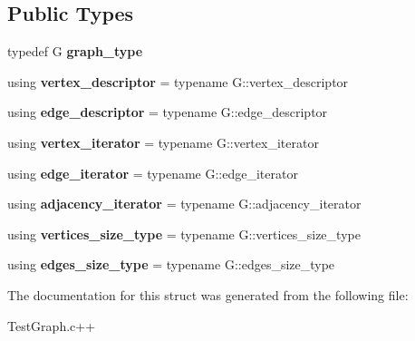 \subsection*{Public Types}
\begin{DoxyCompactItemize}
\item 
\hypertarget{structTestGraph_a149d9d185e2299b108590e2f83804351}{typedef G {\bfseries graph\-\_\-type}}\label{structTestGraph_a149d9d185e2299b108590e2f83804351}

\item 
\hypertarget{structTestGraph_ab66a56354d7a5751bf100ed3318bc498}{using {\bfseries vertex\-\_\-descriptor} = typename G\-::vertex\-\_\-descriptor}\label{structTestGraph_ab66a56354d7a5751bf100ed3318bc498}

\item 
\hypertarget{structTestGraph_a9cbf180f1275812b6162f30131bf55c3}{using {\bfseries edge\-\_\-descriptor} = typename G\-::edge\-\_\-descriptor}\label{structTestGraph_a9cbf180f1275812b6162f30131bf55c3}

\item 
\hypertarget{structTestGraph_a9ba4046e954f315bb4cf30cc93b07eac}{using {\bfseries vertex\-\_\-iterator} = typename G\-::vertex\-\_\-iterator}\label{structTestGraph_a9ba4046e954f315bb4cf30cc93b07eac}

\item 
\hypertarget{structTestGraph_a381ec62e5e7dd0855873bd39cd23683e}{using {\bfseries edge\-\_\-iterator} = typename G\-::edge\-\_\-iterator}\label{structTestGraph_a381ec62e5e7dd0855873bd39cd23683e}

\item 
\hypertarget{structTestGraph_a60336f93dc849f8acf2e8ac5c58785c3}{using {\bfseries adjacency\-\_\-iterator} = typename G\-::adjacency\-\_\-iterator}\label{structTestGraph_a60336f93dc849f8acf2e8ac5c58785c3}

\item 
\hypertarget{structTestGraph_a4b79f255258682679cad928f6d9bd8f1}{using {\bfseries vertices\-\_\-size\-\_\-type} = typename G\-::vertices\-\_\-size\-\_\-type}\label{structTestGraph_a4b79f255258682679cad928f6d9bd8f1}

\item 
\hypertarget{structTestGraph_a25d25458180a480adb3e05d404282f46}{using {\bfseries edges\-\_\-size\-\_\-type} = typename G\-::edges\-\_\-size\-\_\-type}\label{structTestGraph_a25d25458180a480adb3e05d404282f46}

\end{DoxyCompactItemize}


The documentation for this struct was generated from the following file\-:\begin{DoxyCompactItemize}
\item 
Test\-Graph.\-c++\end{DoxyCompactItemize}
